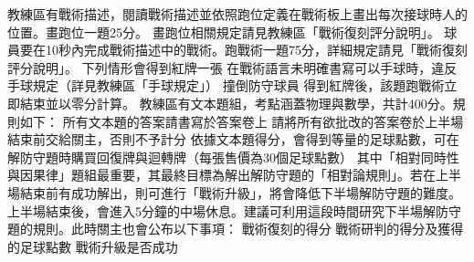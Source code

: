 {}\markdownRendererSectionBegin
{}\markdownRendererInterblockSeparator
{}教練區有戰術描述，閱讀戰術描述並依照跑位定義在戰術板上畫出每次接球時人的位置。畫跑位一題25分。\markdownRendererSoftLineBreak
{}畫跑位相關規定請見教練區「戰術復刻評分說明」。\markdownRendererInterblockSeparator
{}
\markdownRendererSectionEnd \markdownRendererSectionBegin
{}\markdownRendererInterblockSeparator
{}球員要在10秒內完成戰術描述中的戰術。跑戰術一題75分，詳細規定請見「戰術復刻評分說明」。\markdownRendererInterblockSeparator
{}
\markdownRendererSectionEnd \markdownRendererSectionBegin
{}\markdownRendererInterblockSeparator
{}下列情形會得到紅牌一張\markdownRendererInterblockSeparator
{}\markdownRendererUlBeginTight
\markdownRendererUlItem 在戰術語言未明確書寫可以手球時，違反手球規定（詳見教練區「手球規定」）\markdownRendererUlItemEnd 
\markdownRendererUlItem 撞倒防守球員\markdownRendererSoftLineBreak
{}得到紅牌後，該題跑戰術立即結束並以零分計算。\markdownRendererUlItemEnd 
\markdownRendererUlEndTight \markdownRendererInterblockSeparator
{}
\markdownRendererSectionEnd 
\markdownRendererSectionEnd \markdownRendererSectionBegin
{}\markdownRendererInterblockSeparator
{}教練區有文本題組，考點涵蓋物理與數學，共計400分。規則如下：\markdownRendererInterblockSeparator
{}\markdownRendererOlBeginTight
{}所有文本題的答案請書寫於答案卷上\markdownRendererOlItemEnd 
{}請將所有欲批改的答案卷於上半場結束前交給關主，否則不予計分\markdownRendererOlItemEnd 
{}依據文本題得分，會得到等量的足球點數，可在解防守題時購買回復牌與迴轉牌（每張售價為30個足球點數）\markdownRendererOlItemEnd 
\markdownRendererOlEndTight \markdownRendererInterblockSeparator
{}其中「相對同時性與因果律」題組最重要，其最終目標為解出解防守題的「相對論規則」。若在上半場結束前有成功解出，則可進行「戰術升級」，將會降低下半場解防守題的難度。\markdownRendererInterblockSeparator
{}
\markdownRendererSectionEnd \markdownRendererSectionBegin
{}\markdownRendererInterblockSeparator
{}上半場結束後，會進入5分鐘的中場休息。建議可利用這段時間研究下半場解防守題的規則。此時關主也會公布以下事項：\markdownRendererInterblockSeparator
{}\markdownRendererOlBeginTight
{}戰術復刻的得分\markdownRendererOlItemEnd 
{}戰術研判的得分及獲得的足球點數\markdownRendererOlItemEnd 
{}戰術升級是否成功\markdownRendererOlItemEnd 

